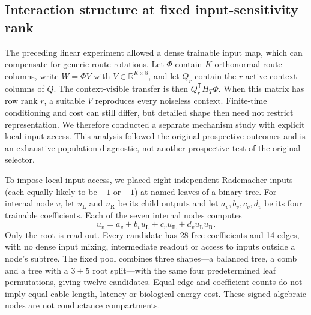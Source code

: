 \subsection{Interaction structure at fixed input-sensitivity rank}
\label{note:interaction_structure}

The preceding linear experiment allowed a dense trainable input map, which
can compensate for generic route rotations. Let $\Phi$ contain $K$
orthonormal route columns, write $W=\Phi V$ with
$V\in\mathbb R^{K\times8}$, and let $Q_r$ contain the $r$ active
context columns of $Q$. The context-visible transfer is then
$Q_r^{\mathsf T}H_T\Phi$. When this matrix
has row rank $r$, a suitable $V$ reproduces every noiseless context. Finite-time
conditioning and cost can still differ, but detailed shape then need not
restrict representation. We therefore conducted a separate mechanism study
with explicit local input access. This analysis followed the original
prospective outcomes and is an exhaustive population diagnostic, not another
prospective test of the original selector.

To impose local input access, we placed eight independent Rademacher inputs
(each equally likely to be $-1$ or $+1$) at named leaves of a binary tree.
For internal node $v$, let $u_{\mathrm L}$ and $u_{\mathrm R}$ be its
child outputs and let $a_v,b_v,c_v,d_v$ be its four trainable coefficients.
Each of the seven internal nodes computes
\begin{equation}
 u_v=a_v+b_vu_{\mathrm L}+c_vu_{\mathrm R}
       +d_vu_{\mathrm L}u_{\mathrm R}.
 \label{eq:s_multiaffine_node}
\end{equation}
Only the root is read out. Every candidate has 28 free coefficients and 14
edges, with no dense input mixing, intermediate readout or access to inputs
outside a node's subtree.
The fixed pool combines three shapes---a balanced tree, a comb and a tree
with a $3+5$ root split---with the same four predetermined leaf permutations,
giving twelve candidates. Equal edge
and coefficient counts do not imply equal cable length, latency or biological
energy cost. These signed algebraic nodes are not conductance compartments.

